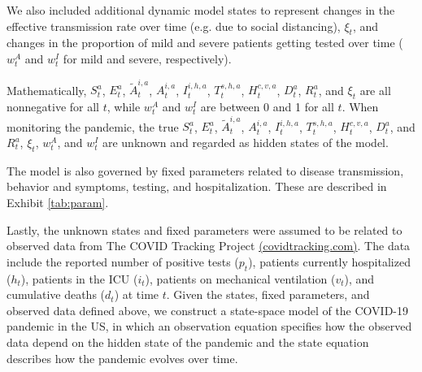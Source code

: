 \documentclass{article}
\begin{document}
We also included additional dynamic model states to represent changes in the effective transmission rate over time (e.g. due to social distancing), $\xi_t$, and changes in the proportion of mild and severe patients getting tested over time ($w^A_t$ and $w^I_t$ for mild and severe, respectively).

Mathematically, $S^a_t$, $E^a_t$, $\tilde{A}^{i,a}_t$, $A^{i,a}_t$, $I^{i,h,a}_t$, $T^{s,h,a}_t$, $H^{c,v,a}_t$, $D^a_t$, $R^a_t$, and $\xi_t$ are all nonnegative for all $t$, while $w^A_t$ and $w^I_t$ are between 0 and 1 for all $t$. When monitoring the pandemic, the true $S^a_t$, $E^a_t$, $\tilde{A}^{i,a}_t$, $A^{i,a}_t$, $I^{i,h,a}_t$, $T^{s,h,a}_t$, $H^{c,v,a}_t$, $D^a_t$, and $R^a_t$, $\xi_t$, $w^A_t$, and $w^I_t$ are unknown and regarded as hidden states of the model.

The model is also governed by fixed parameters related to disease transmission, behavior and symptoms, testing, and hospitalization. These are described in Exhibit \ref{tab:param}.

Lastly, the unknown states and fixed parameters were assumed to be related to observed data from The COVID Tracking Project \href{covidtracking.com}{(covidtracking.com)}.  The data include the reported number of positive tests ($p_t$), patients currently hospitalized ($h_t$), patients in the ICU ($i_t$), patients on mechanical ventilation ($v_t$), and cumulative deaths ($d_t$) at time $t$. Given the states, fixed parameters, and observed data defined above, we construct a state-space model of the COVID-19 pandemic in the US, in which an observation equation specifies how the observed data depend on the hidden state of the pandemic and the state equation describes how the pandemic evolves over time.
\end{document}
